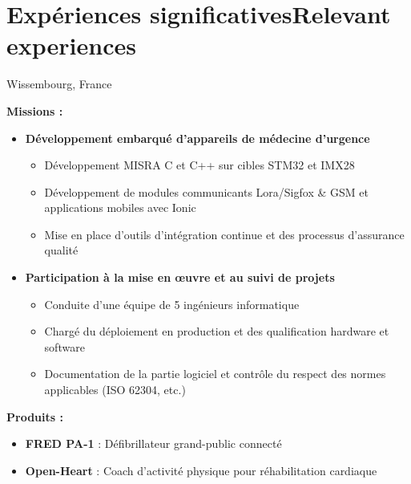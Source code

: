 \section{\ifnativelang Exp\'eriences significatives\else Relevant experiences\fi}

{}{}{Wissembourg, France}{
\ifnativelang
	\textcolor{color1}{\textbf{Missions :}}
	\begin{itemize}[leftmargin=\ListItemsMargins]
		\item \textbf{Développement embarqué d'appareils de médecine d’urgence}
		\begin{itemize}
			\item D\'eveloppement MISRA C et C++ sur cibles STM32 et IMX28
			\item D\'eveloppement de modules communicants Lora/Sigfox \& GSM et applications mobiles avec Ionic
			\item Mise en place d'outils d'intégration continue et des processus d'assurance qualit\'e
		\end{itemize}
		\item \textbf{Participation \`a la mise en \oe uvre et au suivi de projets}
		\begin{itemize}
			\ifaddmngt \item Conduite d’une équipe de 5 ingénieurs informatique  \fi
			\item Chargé du déploiement en production et des qualification hardware et software
			\item Documentation de la partie logiciel et contrôle du respect des normes applicables (ISO 62304, etc.)
		\end{itemize}
	\end{itemize}
	\vspace{\ItemsMinSpacing}
	\textcolor{color1}{\textbf{Produits :}}
	\begin{itemize}[leftmargin=\ListItemsMargins]
		\item \textbf{FRED PA-1} : Défibrillateur grand-public connecté \textcolor{color1}{\href{http://www.schiller.ch/fr/fr/product/fred-pa-1}{\ExternalLink}}
		\item \textbf{Open-Heart} : Coach d'activit\'e physique pour r\'ehabilitation cardiaque \textcolor{color1}{\href{http://www.schiller.ch/fr/fr/schiller-\%C3\%A0-la-fine-pointe-de-la-sant\%C3\%A9-connect\%C3\%A9e}{\ExternalLink}}

\end{itemize}}
